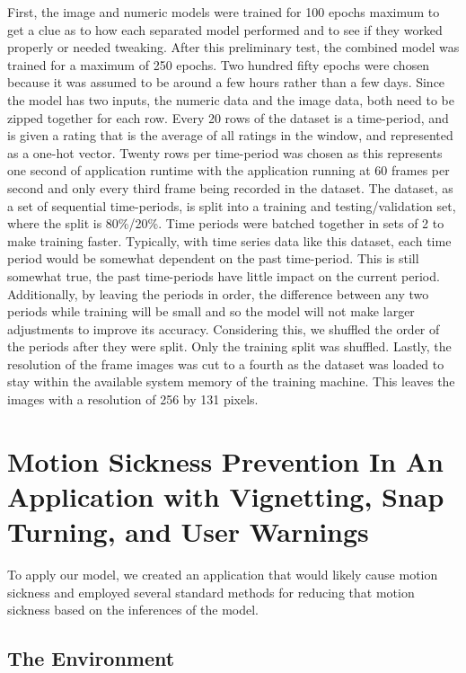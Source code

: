 First, the image and numeric models were trained for 100 epochs maximum to get a clue as to how each separated model performed and to see if they worked properly or needed tweaking.
After this preliminary test, the combined model was trained for a maximum of 250 epochs.
Two hundred fifty epochs were chosen because it was assumed to be around a few hours rather than a few days.
Since the model has two inputs, the numeric data and the image data, both need to be zipped together for each row.
Every 20 rows of the dataset is a time-period, and is given a rating that is the average of all ratings in the window, and represented as a one-hot vector.
Twenty rows per time-period was chosen as this represents one second of application runtime with the application running at 60 frames per second and only every third frame being recorded in the dataset.
The dataset, as a set of sequential time-periods, is split into a training and testing/validation set, where the split is 80\%/20\%.
Time periods were batched together in sets of 2 to make training faster.
Typically, with time series data like this dataset, each time period would be somewhat dependent on the past time-period.
This is still somewhat true, the past time-periods have little impact on the current period.
Additionally, by leaving the periods in order, the difference between any two periods while training will be small and so the model will not make larger adjustments to improve its accuracy.
Considering this, we shuffled the order of the periods after they were split.
Only the training split was shuffled.
Lastly, the resolution of the frame images was cut to a fourth as the dataset was loaded to stay within the available system memory of the training machine.
This leaves the images with a resolution of 256 by 131 pixels.

\section{Motion Sickness Prevention In An Application with Vignetting, Snap Turning, and User Warnings}
\label{sec:prevention}

To apply our model, we created an application that would likely cause motion sickness and employed several standard methods for reducing that motion sickness based on the inferences of the model.

\subsection{The Environment}
\label{subsec:environment}

